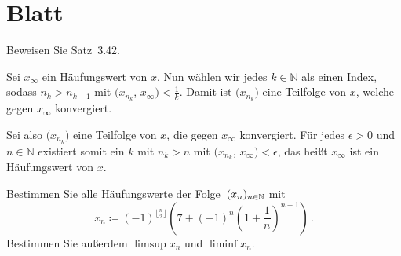 \section{Blatt}

\begin{aufg}[6 Punkte]
Beweisen Sie Satz~3.42.
\end{aufg}

\bigskip

\begin{lsg} 
Sei \(x_{\infty}\) ein Häufungswert von $x$. Nun wählen wir jedes $k\in\mathbb{N}$ als einen Index,
sodass \(n_{k}\)$>$\(n_{k-1}\) mit $($\(x_{n_{k}}\), \(x_{\infty}\)$)$$<$\(\frac{1}{k}\). 
Damit ist $($\(x_{n_{k}}\)$)$ eine Teilfolge von $x$, welche gegen \(x_{\infty}\) konvergiert.

Sei also $($\(x_{n_{k}}\)$)$ eine Teilfolge von $x$, die gegen \(x_{\infty}\) konvergiert. 
Für jedes $\epsilon > 0$ und  $n\in\mathbb{N}$ existiert somit ein $k$ mit \(n_{k}\)$>n$ mit  
$($\(x_{n_{k}}\), \(x_{\infty}\)$)$$< \epsilon$, das heißt \(x_{\infty}\) ist ein Häufungswert von $x$.
\end{lsg}

\bigskip


\begin{aufg}[6 Punkte]
Bestimmen Sie alle H\"aufungswerte der Folge~$(x_n)_{n\in\mathbb{N}}$ mit 
\[
 x_n \coloneqq (-1)^{\lfloor \frac{n}{2}\rfloor} \left( 7 + (-1)^n\left(1+\frac1n\right)^{n+1} \right)\,. 
\]
Bestimmen Sie au{\ss}erdem $\limsup x_n$ und $\liminf x_n$.
\end{aufg}

\bigskip

